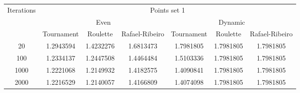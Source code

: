 \begin{center}
	\begin{tabular}{|c|c|c|c|c|c|c|}
		\hline
		\multirow{3}{*}{Iterations}	&	\multicolumn{6}{c|}{Points set 1}	\\
										\cline{2-7}
									&	\multicolumn{3}{c|}{Even}	& \multicolumn{3}{c|}{Dynamic} \\
										\cline{2-7}
									&	Tournament		&	Roulette		&	Rafael-Ribeiro	&	Tournament		&	Roulette		&	Rafael-Ribeiro		\\
		\hline								
		20							&	1.2943594 		&	1.4232276		&	1.6813473 		&	1.7981805		&	1.7981805			&	1.7981805		\\
		\hline
		100							&	1.2334137 		&	1.2447508 		&	1.4464484 		&	1.5103336		&	1.7981805			&	1.7981805		\\
		\hline
		1000						&	1.2221068 		&	1.2149932 		&	1.4182575 		&	1.4090841		&	1.7981805			&	1.7981805		\\
		\hline
		2000						&	1.2216529 		&	1.2140057 		&	1.4166809 		&	1.4074098		&	1.7981805			&	1.7981805		\\
		\hline
	\end{tabular}
	\label{tab:selection_type}
\end{center}
